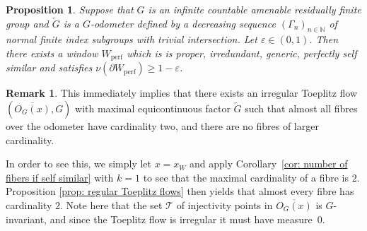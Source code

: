 \documentclass[titlepage,reqno,10pt]{amsart}
\newtheorem{proposition}[theorem]{Proposition}
\theoremstyle{definition}
\newtheorem{remark}[theorem]{Remark}
\begin{document}
\begin{proposition}\label{prop: W_perf}
Suppose that $G$ is an infinite countable amenable residually finite group and $\overleftarrow{G}$ is a $G$-odometer defined by a decreasing sequence $(\Gamma_n)_{n\in\mathbb{N}}$ of normal finite index subgroups with trivial intersection. 
Let $\varepsilon\in(0,1)$. Then there exists a window $W_{\mathrm{perf}}$ which is is proper, irredundant, generic, perfectly self similar and satisfies $\nu(\partial W_{\mathrm{perf}}) \geq 1-\varepsilon$.
\end{proposition} 

\begin{remark}
    This immediately implies that there exists an irregular Toeplitz flow $\left(\overline{O_G(x)},G\right)$ with maximal equicontinuous factor $\overleftarrow{G}$ such that almost all fibres over the odometer have cardinality two, and there are no fibres of larger cardinality. 

    In order to see this, we simply let $x=x_W$ and apply Corollary~\ref{cor: number of fibers if self similar} with $k=1$ to see that the maximal cardinality of a fibre is $2$. Proposition \ref{prop: regular Toeplitz flows} then yields that almost every fibre has cardinality $2$. Note here that the set $\mathcal{T}$ of injectivity points in $\overline{O_G(x)}$ is $G$-invariant, and since the Toeplitz flow is irregular it must have measure~$0$. 
\end{remark}
\end{document}
